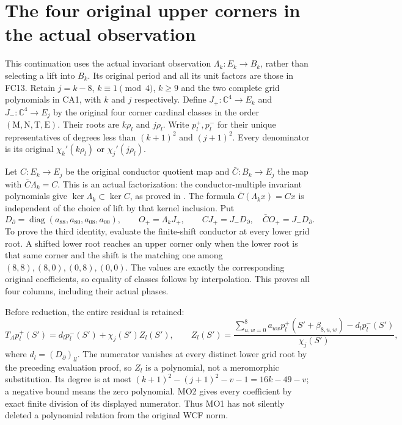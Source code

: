 \documentclass[11pt]{article}
\newcommand{\C}{\mathbb C}
\newcommand{\diag}{\operatorname{diag}}
\begin{document}
\section{The four original upper corners in the actual observation}
This continuation uses the actual invariant observation
$\Lambda_k:E_k\to B_k$, rather than selecting a lift into $B_k$.
Its original period and all its unit factors are those in FC13.
Retain $j=k-8$, $k\equiv1\pmod4$, $k\ge9$ and the two complete
grid polynomials in CA1, with $k$ and $j$ respectively. Define
$J_+:\C^4\to E_k$ and $J_-:\C^4\to E_j$ by the original
four corner cardinal classes in the order
$(\mathrm M,\mathrm N,\mathrm T,\mathrm E)$.
Their roots are $k\rho_l$ and $j\rho_l$. Write $p_l^+,p_l^-$
for their unique representatives of degrees less than $(k+1)^2$
and $(j+1)^2$. Every denominator is its original
$\chi_k'(k\rho_l)$ or $\chi_j'(j\rho_l)$.

Let $C:E_k\to E_j$ be the original conductor quotient map and
$\bar C:B_k\to E_j$ the map with $\bar C\Lambda_k=C$.
This is an actual factorization: the conductor-multiple invariant
polynomials give $\ker\Lambda_k\subset\ker C$, as proved in
\cite[OB3]{Observed}. The formula
$\bar C(\Lambda_kx)=Cx$ is independent of the choice of lift
by that kernel inclusion. Put
\[
 D_\partial=\diag(a_{88},a_{80},a_{08},a_{00}),\qquad
 O_+=\Lambda_kJ_+,\qquad
 CJ_+=J_-D_\partial,\quad
 \bar C O_+=J_-D_\partial. \tag{MO1}
\]
To prove the third identity, evaluate the finite-shift conductor
at every lower grid root. A shifted lower root reaches an upper
corner only when the lower root is that same corner and the
shift is the matching one among $(8,8),(8,0),(0,8),(0,0)$.
The values are exactly the corresponding original coefficients,
so equality of classes follows by interpolation. This proves
all four columns, including their actual phases.

Before reduction, the entire residual is retained:
\[
 T_Ap_l^+(S')=d_l p_l^-(S')+\chi_j(S')Z_l(S'),\qquad
 Z_l(S')=\frac{\sum_{u,w=0}^8a_{uw}
 p_l^+(S'+\beta_{8,u,w})-d_l p_l^-(S')}{\chi_j(S')},
 \tag{MO2}
\]
where $d_l=(D_\partial)_{ll}$.
The numerator vanishes at every distinct lower grid root by the
preceding evaluation proof, so $Z_l$ is a polynomial, not a
meromorphic substitution. Its degree is at most
$(k+1)^2-(j+1)^2-v-1=16k-49-v$; a negative bound means the
zero polynomial. MO2 gives every coefficient by exact finite
division of its displayed numerator. Thus MO1 has not silently
deleted a polynomial relation from the original WCF norm.
\end{document}

